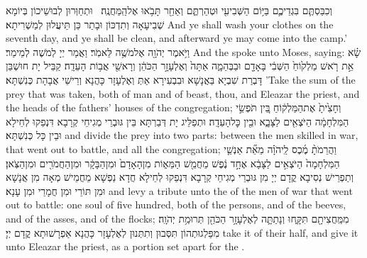 {וְכִבַּסְתֶּ֧ם בִּגְדֵיכֶ֛ם בַּיּ֥וֹם הַשְּׁבִיעִ֖י וּטְהַרְתֶּ֑ם וְאַחַ֖ר תָּבֹ֥אוּ אֶל\maqqaf הַֽמַּחֲנֶֽה׃ \setuma }
{וּתְחַוְּרוּן לְבוּשֵׁיכוֹן בְּיוֹמָא שְׁבִיעָאָה וְתִדְכּוֹן וּבָתַר כֵּן תֵּיעֲלוּן לְמַשְׁרִיתָא׃}
{And ye shall wash your clothes on the seventh day, and ye shall be clean, and afterward ye may come into the camp.’}{}
{וַיֹּ֥אמֶר יְהֹוָ֖ה אֶל\maqqaf מֹשֶׁ֥ה לֵּאמֹֽר׃}
{וַאֲמַר יְיָ לְמֹשֶׁה לְמֵימַר׃}
{And the \lord\space spoke unto Moses, saying:}{}
{שָׂ֗א אֵ֣ת רֹ֤אשׁ מַלְק֙וֹחַ֙ הַשְּׁבִ֔י בָּאָדָ֖ם וּבַבְּהֵמָ֑ה אַתָּה֙ וְאֶלְעָזָ֣ר הַכֹּהֵ֔ן וְרָאשֵׁ֖י אֲב֥וֹת הָעֵדָֽה׃}
{קַבֵּיל יָת חוּשְׁבַּן דָּבְרַת שִׁבְיָא בַּאֲנָשָׁא וּבִבְעִירָא אַתְּ וְאֶלְעָזָר כָּהֲנָא וְרֵישֵׁי אֲבָהָת כְּנִשְׁתָּא׃}
{’Take the sum of the prey that was taken, both of man and of beast, thou, and Eleazar the priest, and the heads of the fathers’ houses of the congregation;}{}
{וְחָצִ֙יתָ֙ אֶת\maqqaf הַמַּלְק֔וֹחַ בֵּ֚ין תֹּפְשֵׂ֣י הַמִּלְחָמָ֔ה הַיֹּצְאִ֖ים לַצָּבָ֑א וּבֵ֖ין כׇּל\maqqaf הָעֵדָֽה׃}
{וּתְפַלֵּיג יָת דְּבַרְתָּא בֵּין גּוּבְרֵי מְגִיחֵי קְרָבָא דִּנְפַקוּ לְחֵילָא וּבֵין כָּל כְּנִשְׁתָּא׃}
{and divide the prey into two parts: between the men skilled in war, that went out to battle, and all the congregation;}{}
{וַהֲרֵמֹתָ֨ מֶ֜כֶס לַֽיהֹוָ֗ה מֵאֵ֞ת אַנְשֵׁ֤י הַמִּלְחָמָה֙ הַיֹּצְאִ֣ים לַצָּבָ֔א אֶחָ֣ד נֶ֔פֶשׁ מֵחֲמֵ֖שׁ הַמֵּא֑וֹת מִן\maqqaf הָאָדָם֙ וּמִן\maqqaf הַבָּקָ֔ר וּמִן\maqqaf הַחֲמֹרִ֖ים וּמִן\maqqaf הַצֹּֽאן׃}
{וְתַפְרֵישׁ נְסִיבָא קֳדָם יְיָ מִן גּוּבְרֵי מְגִיחֵי קְרָבָא דִּנְפַקוּ לְחֵילָא חֲדָא נַפְשָׁא מֵחֲמֵישׁ מְאָה מִן אֲנָשָׁא וּמִן תּוֹרֵי וּמִן חֲמָרֵי וּמִן עָנָא׃}
{and levy a tribute unto the \lord\space of the men of war that went out to battle: one soul of five hundred, both of the persons, and of the beeves, and of the asses, and of the flocks;}{}
{מִמַּֽחֲצִיתָ֖ם תִּקָּ֑חוּ וְנָתַתָּ֛ה לְאֶלְעָזָ֥ר הַכֹּהֵ֖ן תְּרוּמַ֥ת יְהֹוָֽה׃}
{מִפַּלְגוּתְהוֹן תִּסְּבוּן וְתִתְּנוּן לְאֶלְעָזָר כָּהֲנָא אַפְרָשׁוּתָא קֳדָם יְיָ׃}
{take it of their half, and give it unto Eleazar the priest, as a portion set apart for the \lord.}{}
